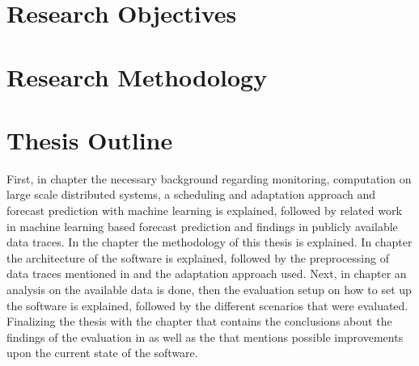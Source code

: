         \section{Research Objectives}
        \label{sec:research-objectives-introduction}

        \section{Research Methodology}
        \label{sec:research-methodology-introduction}
        
        \section{Thesis Outline}
        \label{sec:thesis-outline-introduction}

            First, in chapter  the necessary background regarding monitoring, computation on large scale distributed systems, a scheduling and adaptation approach and forecast prediction with machine learning is explained, followed by related work in machine learning based forecast prediction and findings in publicly available data traces.
            In the chapter  the methodology of this thesis is explained. 
            In chapter  the architecture of the software is explained, followed by the preprocessing of data traces mentioned in  and the adaptation approach used.
            Next, in chapter  an analysis on the available data is done, then the evaluation setup on how to set up the software is explained, followed by the different scenarios that were evaluated. 
            Finalizing the thesis with the chapter  that contains the conclusions about the findings of the evaluation in  as well as the  that mentions possible improvements upon the current state of the software.


